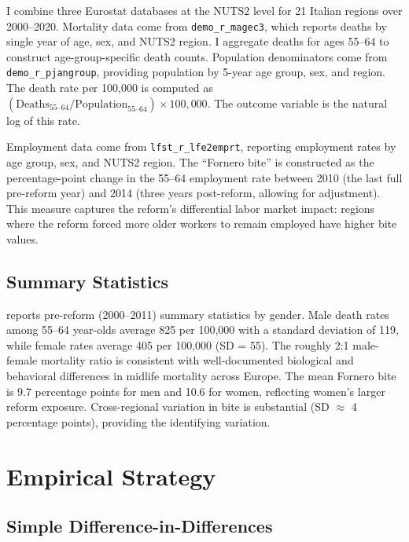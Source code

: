 \documentclass[12pt]{article}
\begin{document}
I combine three Eurostat databases at the NUTS2 level for 21 Italian regions over 2000--2020. Mortality data come from \texttt{demo\_r\_magec3}, which reports deaths by single year of age, sex, and NUTS2 region. I aggregate deaths for ages 55--64 to construct age-group-specific death counts. Population denominators come from \texttt{demo\_r\_pjangroup}, providing population by 5-year age group, sex, and region. The death rate per 100,000 is computed as $(\text{Deaths}_{55\text{--}64} / \text{Population}_{55\text{--}64}) \times 100{,}000$. The outcome variable is the natural log of this rate.

Employment data come from \texttt{lfst\_r\_lfe2emprt}, reporting employment rates by age group, sex, and NUTS2 region. The ``Fornero bite'' is constructed as the percentage-point change in the 55--64 employment rate between 2010 (the last full pre-reform year) and 2014 (three years post-reform, allowing for adjustment). This measure captures the reform's differential labor market impact: regions where the reform forced more older workers to remain employed have higher bite values.

\subsection{Summary Statistics}

 reports pre-reform (2000--2011) summary statistics by gender. Male death rates among 55--64 year-olds average 825 per 100,000 with a standard deviation of 119, while female rates average 405 per 100,000 (SD = 55). The roughly 2:1 male-female mortality ratio is consistent with well-documented biological and behavioral differences in midlife mortality across Europe. The mean Fornero bite is 9.7 percentage points for men and 10.6 for women, reflecting women's larger reform exposure. Cross-regional variation in bite is substantial (SD $\approx$ 4 percentage points), providing the identifying variation.



\section{Empirical Strategy}

\subsection{Simple Difference-in-Differences}
\end{document}
